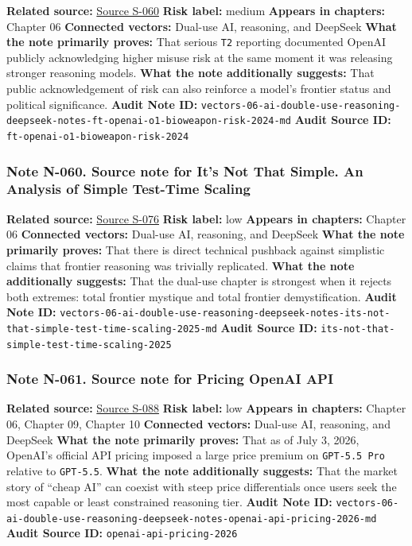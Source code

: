 \documentclass[
  american,
  11pt,
  letterpaper,
]{article}
\begin{document}
\textbf{Related source:}
\hyperref[source-s-060-openai-acknowledges-new-models-increase-risk-of-misuse-to-create-bioweapons]{Source
S-060} \textbf{Risk label:} medium \textbf{Appears in chapters:} Chapter
06 \textbf{Connected vectors:} Dual-use AI, reasoning, and DeepSeek
\textbf{What the note primarily proves:} That serious \texttt{T2}
reporting documented OpenAI publicly acknowledging higher misuse risk at
the same moment it was releasing stronger reasoning models. \textbf{What
the note additionally suggests:} That public acknowledgement of risk can
also reinforce a model's frontier status and political significance.
\textbf{Audit Note ID:}
\texttt{vectors-06-ai-double-use-reasoning-deepseek-notes-ft-openai-o1-bioweapon-risk-2024-md}
\textbf{Audit Source ID:} \texttt{ft-openai-o1-bioweapon-risk-2024}

\subsubsection{Note N-060. Source note for It's Not That Simple. An
Analysis of Simple Test-Time
Scaling}\label{note-n-060-vectors-06-ai-double-use-reasoning-deepseek-notes-its-not-that-simple-test-time-scaling-2025-md}

\textbf{Related source:}
\hyperref[source-s-076-it-s-not-that-simple-an-analysis-of-simple-test-time-scaling]{Source
S-076} \textbf{Risk label:} low \textbf{Appears in chapters:} Chapter 06
\textbf{Connected vectors:} Dual-use AI, reasoning, and DeepSeek
\textbf{What the note primarily proves:} That there is direct technical
pushback against simplistic claims that frontier reasoning was trivially
replicated. \textbf{What the note additionally suggests:} That the
dual-use chapter is strongest when it rejects both extremes: total
frontier mystique and total frontier demystification. \textbf{Audit Note
ID:}
\texttt{vectors-06-ai-double-use-reasoning-deepseek-notes-its-not-that-simple-test-time-scaling-2025-md}
\textbf{Audit Source ID:}
\texttt{its-not-that-simple-test-time-scaling-2025}

\subsubsection{Note N-061. Source note for Pricing \textbar{} OpenAI
API}\label{note-n-061-vectors-06-ai-double-use-reasoning-deepseek-notes-openai-api-pricing-2026-md}

\textbf{Related source:}
\hyperref[source-s-088-pricing-openai-api]{Source S-088} \textbf{Risk
label:} low \textbf{Appears in chapters:} Chapter 06, Chapter 09,
Chapter 10 \textbf{Connected vectors:} Dual-use AI, reasoning, and
DeepSeek \textbf{What the note primarily proves:} That as of July 3,
2026, OpenAI's official API pricing imposed a large price premium on
\texttt{GPT-5.5\ Pro} relative to \texttt{GPT-5.5}. \textbf{What the
note additionally suggests:} That the market story of ``cheap AI'' can
coexist with steep price differentials once users seek the most capable
or least constrained reasoning tier. \textbf{Audit Note ID:}
\texttt{vectors-06-ai-double-use-reasoning-deepseek-notes-openai-api-pricing-2026-md}
\textbf{Audit Source ID:} \texttt{openai-api-pricing-2026}
\end{document}
